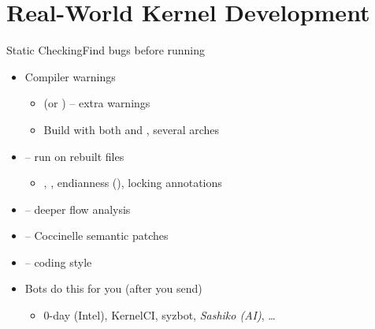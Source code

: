 
\section{Real-World Kernel Development}
\frame{\sectionpage}

\begin{frame}{Static Checking}{Find bugs before running}

  \begin{itemize}[<+->]
    \item Compiler warnings
      \begin{itemize}[<.->]
	\item {} (or ) -- extra warnings
	\item Build with both  and , several arches
      \end{itemize}
    \item {} -- run  on rebuilt files
      \begin{itemize}[<.->]
	\item {}, , endianness (), locking annotations
      \end{itemize}
    \item {} -- deeper flow analysis
    \item {} -- Coccinelle semantic patches
    \item {} -- coding style
    \item Bots do this for you (after you send)
      \begin{itemize}[<.->]
	\item 0-day (Intel), KernelCI, syzbot, \emph{Sashiko (AI)}, \dots
      \end{itemize}
  \end{itemize}

\end{frame}

